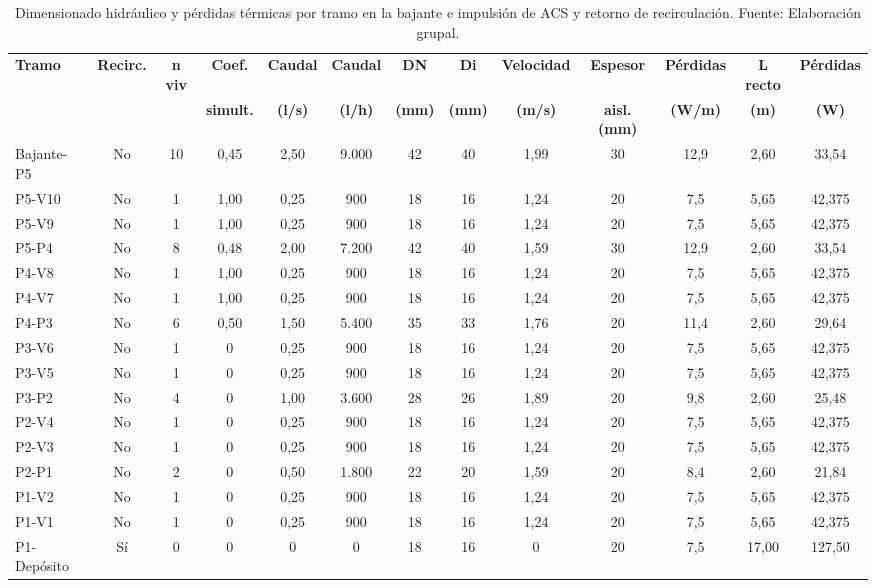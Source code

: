 \documentclass[12pt]{article}
\begin{document}
\begin{landscape}
\begin{table}[p]
\centering
\footnotesize
\setlength{\tabcolsep}{2pt}
\caption{Dimensionado hidráulico y pérdidas térmicas por tramo en la bajante e impulsión de ACS y retorno de recirculación. Fuente: Elaboración grupal.}
\label{tab:tramos_distribucion}
\begin{tabular}{lcccccccccccc}
\toprule
\textbf{Tramo} & \textbf{Recirc.} & \textbf{n viv} & \textbf{Coef.} & \textbf{Caudal} & \textbf{Caudal} & \textbf{DN} & \textbf{Di} & \textbf{Velocidad} & \textbf{Espesor} & \textbf{Pérdidas} & \textbf{L recto} & \textbf{Pérdidas} \\
 & & & \textbf{simult.} & \textbf{(l/s)} & \textbf{(l/h)} & \textbf{(mm)} & \textbf{(mm)} & \textbf{(m/s)} & \textbf{aisl. (mm)} & \textbf{(W/m)} & \textbf{(m)} & \textbf{(W)} \\
\midrule
Bajante-P5 & No & 10 & 0,45 & 2,50 & 9.000 & 42 & 40 & 1,99 & 30 & 12,9 & 2,60 & 33,54 \\
P5-V10 & No & 1 & 1,00 & 0,25 & 900 & 18 & 16 & 1,24 & 20 & 7,5 & 5,65 & 42,375 \\
P5-V9 & No & 1 & 1,00 & 0,25 & 900 & 18 & 16 & 1,24 & 20 & 7,5 & 5,65 & 42,375 \\
P5-P4 & No & 8 & 0,48 & 2,00 & 7.200 & 42 & 40 & 1,59 & 30 & 12,9 & 2,60 & 33,54 \\
P4-V8 & No & 1 & 1,00 & 0,25 & 900 & 18 & 16 & 1,24 & 20 & 7,5 & 5,65 & 42,375 \\
P4-V7 & No & 1 & 1,00 & 0,25 & 900 & 18 & 16 & 1,24 & 20 & 7,5 & 5,65 & 42,375 \\
P4-P3 & No & 6 & 0,50 & 1,50 & 5.400 & 35 & 33 & 1,76 & 20 & 11,4 & 2,60 & 29,64 \\
P3-V6 & No & 1 & 0 & 0,25 & 900 & 18 & 16 & 1,24 & 20 & 7,5 & 5,65 & 42,375 \\
P3-V5 & No & 1 & 0 & 0,25 & 900 & 18 & 16 & 1,24 & 20 & 7,5 & 5,65 & 42,375 \\
P3-P2 & No & 4 & 0 & 1,00 & 3.600 & 28 & 26 & 1,89 & 20 & 9,8 & 2,60 & 25,48 \\
P2-V4 & No & 1 & 0 & 0,25 & 900 & 18 & 16 & 1,24 & 20 & 7,5 & 5,65 & 42,375 \\
P2-V3 & No & 1 & 0 & 0,25 & 900 & 18 & 16 & 1,24 & 20 & 7,5 & 5,65 & 42,375 \\
P2-P1 & No & 2 & 0 & 0,50 & 1.800 & 22 & 20 & 1,59 & 20 & 8,4 & 2,60 & 21,84 \\
P1-V2 & No & 1 & 0 & 0,25 & 900 & 18 & 16 & 1,24 & 20 & 7,5 & 5,65 & 42,375 \\
P1-V1 & No & 1 & 0 & 0,25 & 900 & 18 & 16 & 1,24 & 20 & 7,5 & 5,65 & 42,375 \\
P1-Depósito & Sí & 0 & 0 & 0 & 0 & 18 & 16 & 0 & 20 & 7,5 & 17,00 & 127,50 \\
\bottomrule
\end{tabular}
\end{table}
\end{landscape}
\end{document}
